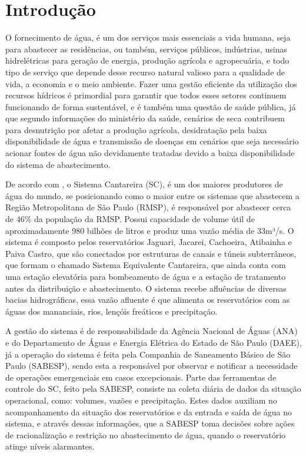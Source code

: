 \chapter{Introdução}

O fornecimento de água, é um dos serviços mais essenciais a vida humana, seja para abastecer as residências, ou também, serviços públicos, indústrias, usinas hidrelétricas para geração de energia, produção agrícola e agropecuária, e todo tipo de serviço que depende desse recurso natural valioso para a qualidade de vida, a economia e o meio ambiente. Fazer uma gestão eficiente da utilização dos recursos hídricos é primordial para garantir que todos esses setores continuem funcionando de forma sustentável, e é também uma questão de saúde pública, já que segundo informações do ministério da saúde, cenários de seca contribuem para desnutrição por afetar a produção agrícola, desidratação pela baixa disponibilidade de água e transmissão de doenças em cenários que seja necessário acionar fontes de água não devidamente tratadas devido a baixa disponibilidade do sistema de abastecimento.  

De acordo com \cite{ANA_Cantareira}, o Sistema Cantareira (SC), é um dos maiores produtores de água do mundo, se posicionando como o maior entre os sistemas que abastecem a Região Metropolitana de São Paulo (RMSP), é responsável por abastecer cerca de 46\% da população da RMSP. Possui capacidade de volume útil de aproximadamente 980 bilhões de litros e produz uma vazão média de 33m³/s. O sistema é composto pelos reservatórios Jaguari, Jacarei, Cachoeira, Atibainha e Paiva Castro, que são conectados por estruturas de canais e túneis subterrâneos, que formam o chamado Sistema Equivalente Cantareira, que ainda conta com uma estação elevatória para bombeamento de água e a estação de tratamento antes da distribuição e abastecimento. O sistema recebe afluências de diversas bacias hidrográficas, essa vazão afluente é que alimenta os reservatórios com as águas dos mananciais, rios, lençóis freáticos e precipitação. 

A gestão do sistema é de responsabilidade da Agência Nacional de Águas (ANA) e do Departamento de Águas e Energia Elétrica do Estado de São Paulo (DAEE), já a operação do sistema é feita pela Companhia de Saneamento Básico de São Paulo (SABESP), sendo esta a responsável por observar e notificar a necessidade de operações emergenciais em casos excepcionais. Parte das ferramentas de controle do SC, feito pela SABESP, consiste na coleta diária de dados da situação operacional, como: volumes, vazões e precipitação. Estes dados auxiliam no acompanhamento da situação dos reservatórios e da entrada e saída de água no sistema, e através dessas informações, que a SABESP toma decisões sobre ações de racionalização e restrição no abastecimento de água, quando o reservatório atinge níveis alarmantes. 

